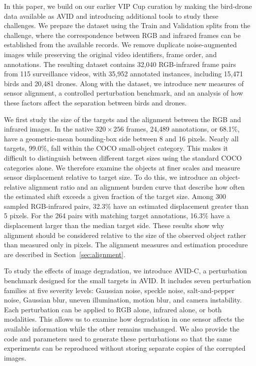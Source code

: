 \documentclass[10pt]{article}
\newcommand{\dataset}{\textsc{AVID}}
\newcommand{\corrupt}{\textsc{AVID-C}}
\begin{document}
In this paper, we build on our earlier VIP Cup curation by making the bird-drone data available as \dataset{} and introducing additional tools to study these challenges. We prepare the dataset using the Train and Validation splits from the challenge, where the correspondence between RGB and infrared frames can be established from the available records. We remove duplicate noise-augmented images while preserving the original video identifiers, frame order, and annotations. The resulting dataset contains 32,040 RGB-infrared frame pairs from 115 surveillance videos, with 35,952 annotated instances, including 15,471 birds and 20,481 drones. Along with the dataset, we introduce new measures of sensor alignment, a controlled perturbation benchmark, and an analysis of how these factors affect the separation between birds and drones.

We first study the size of the targets and the alignment between the RGB and infrared images. In the native $320\times256$ frames, 24,489 annotations, or 68.1\%, have a geometric-mean bounding-box side between 8 and 16 pixels. Nearly all targets, 99.0\%, fall within the COCO small-object category. This makes it difficult to distinguish between different target sizes using the standard COCO categories alone. We therefore examine the objects at finer scales and measure sensor displacement relative to target size. To do this, we introduce an object-relative alignment ratio and an alignment burden curve that describe how often the estimated shift exceeds a given fraction of the target size. Among 300 sampled RGB-infrared pairs, 32.3\% have an estimated displacement greater than 5 pixels. For the 264 pairs with matching target annotations, 16.3\% have a displacement larger than the median target side. These results show why alignment should be considered relative to the size of the observed object rather than measured only in pixels. The alignment measures and estimation procedure are described in Section~\ref{sec:alignment}.

To study the effects of image degradation, we introduce \corrupt{}, a perturbation benchmark designed for the small targets in \dataset{}. It includes seven perturbation families at five severity levels: Gaussian noise, speckle noise, salt-and-pepper noise, Gaussian blur, uneven illumination, motion blur, and camera instability. Each perturbation can be applied to RGB alone, infrared alone, or both modalities. This allows us to examine how degradation in one sensor affects the available information while the other remains unchanged. We also provide the code and parameters used to generate these perturbations so that the same experiments can be reproduced without storing separate copies of the corrupted images.
\end{document}
